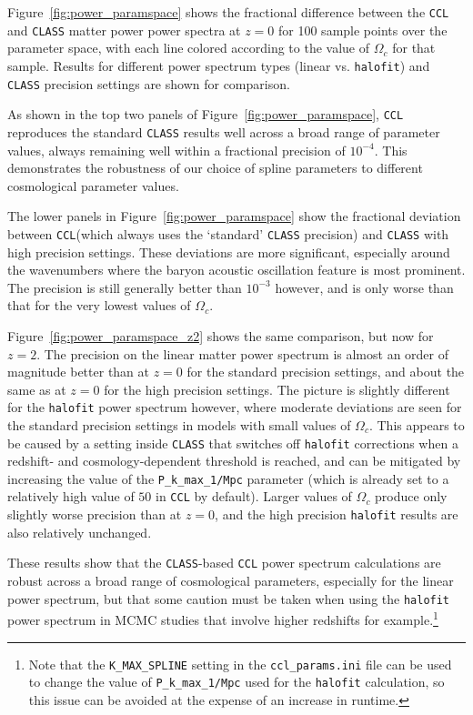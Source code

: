 \documentclass[\docopts]{\docclass}
\newcommand{\ccl}{{\tt CCL}\xspace}
\newcommand{\halofit}{{\tt halofit}\xspace}
\newcommand{\class}{{\tt CLASS}\xspace}
\begin{document}
Figure~\ref{fig:power_paramspace} shows the fractional difference between the \ccl and \class matter power power spectra at $z=0$ for 100 sample points over the parameter space, with each line colored according to the value of $\Omega_c$ for that sample. Results for different power spectrum types (linear vs. \halofit) and \class precision settings are shown for comparison.

As shown in the top two panels of Figure~\ref{fig:power_paramspace}, \ccl reproduces the standard \class results well across a broad range of parameter values, always remaining well within a fractional precision of $10^{-4}$. This demonstrates the robustness of our choice of spline parameters to different cosmological parameter values.

The lower panels in Figure~\ref{fig:power_paramspace} show the fractional deviation between \ccl (which always uses the `standard' \class precision) and \class with high precision settings. These deviations are more significant, especially around the wavenumbers where the baryon acoustic oscillation feature is most prominent. The precision is still generally better than $10^{-3}$ however, and is only worse than that for the very lowest values of $\Omega_c$.

Figure~\ref{fig:power_paramspace_z2} shows the same comparison, but now for $z=2$. The precision on the linear matter power spectrum is almost an order of magnitude better than at $z=0$ for the standard precision settings, and about the same as at $z=0$ for the high precision settings. The picture is slightly different for the \halofit power spectrum however, where moderate deviations are seen for the standard precision settings in models with small values of $\Omega_c$. This appears to be caused by a setting inside \class that switches off \halofit corrections when a redshift- and cosmology-dependent threshold is reached, and can be mitigated by increasing the value of the {\tt P\_k\_max\_1/Mpc} parameter (which is already set to a relatively high value of $50$ in \ccl by default). Larger values of $\Omega_c$ produce only slightly worse precision than at $z=0$, and the high precision \halofit results are also relatively unchanged.

These results show that the \class-based \ccl power spectrum calculations are robust across a broad range of cosmological parameters, especially for the linear power spectrum, but that some caution must be taken when using the \halofit power spectrum in MCMC studies that involve higher redshifts for example.\footnote{Note that the {\tt K\_MAX\_SPLINE} setting in the {\tt ccl\_params.ini} file can be used to change the value of {\tt P\_k\_max\_1/Mpc} used for the \halofit calculation, so this issue can be avoided at the expense of an increase in runtime.}
\end{document}
